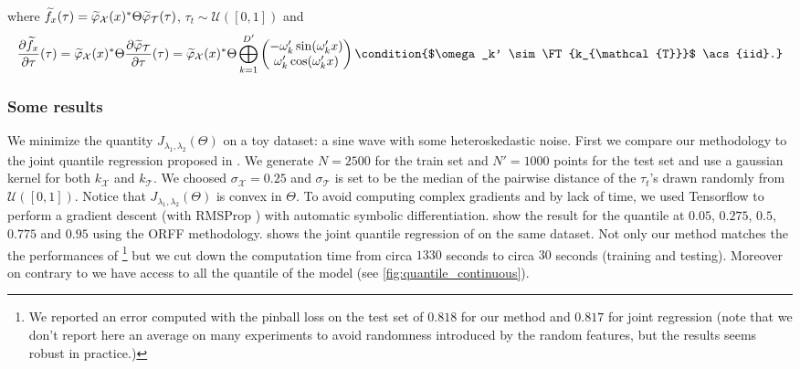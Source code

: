 where $\widetilde{f}_{x}(\tau)=\widetilde{\varphi}_{\mathcal{X}}(x)^*
\Theta \widetilde{\varphi}_{\mathcal{T}}(\tau)$, $\tau_t \sim \mathcal{U}([0,
1])$ and
\begin{dmath*}
    \frac{\partial \widetilde{f}_{x}}{\partial\tau}(\tau)
    = \tildephi{\omega}_{\mathcal{X}}(x)^\adjoint \Theta \frac{\partial
    \tildephi{\omega}_{\mathcal{T}}}{\partial \tau}(\tau)
    = \tildephi{\omega}_{\mathcal{X}}(x)^\adjoint \Theta \Vect_{k=1}^{D'}
    \begin{pmatrix}
        -\omega_k' \sin(\omega_k' x) \\
         \omega_k' \cos(\omega_k' x)
    \end{pmatrix} \condition{$\omega_k' \sim \FT{k_{\mathcal{T}}}$ \acs{iid}.}
\end{dmath*}
\subsubsection{Some results}
We minimize the quantity $J_{\lambda_1, \lambda_2}(\Theta)$ on a toy dataset: a
sine wave with some heteroskedastic noise. First we compare our methodology to
the joint quantile regression proposed in \citet{sangnier2016joint}. We
generate $N=2500$ for the train set and $N'=1000$ points for the test set and
use a gaussian kernel for both $k_{\mathcal{X}}$ and $k_{\mathcal{T}}$. We
choosed $\sigma_{\mathcal{X}} = 0.25$ and $\sigma_{\mathcal{T}}$ is set to be
the median of the pairwise distance of the $\tau_t$'s drawn randomly from
$\mathcal{U}([0, 1])$. Notice that $J_{\lambda_1, \lambda_2}(\Theta)$ is convex
in $\Theta$. To avoid computing complex gradients and by lack of time, we used
Tensorflow \citep{abadi2016tensorflow} to perform a gradient descent (with
RMSProp \citep{tieleman2012lecture}) with automatic symbolic differentiation.
 show the result for the quantile at $0.05$, $0.275$,
$0.5$, $0.775$ and $0.95$ using the \acs{ORFF} methodology. 
 shows the joint quantile regression of
\citet{sangnier2016joint} on the same dataset. Not only our method matches the
the performances of \citet{sangnier2016joint}\footnote{We reported an error
computed with the pinball loss on the test set of $0.818$ for our method and
$0.817$ for joint regression (note that we don't report here an average on many
experiments to avoid randomness introduced by the random features, but the
results seems robust in practice.)} but we cut down the computation time from
circa $1330$ seconds to circa $30$ seconds (training and testing).  Moreover on
contrary to \citet{sangnier2016joint} we have access to all the quantile of the
model (see \cref{fig:quantile_continuous}).

